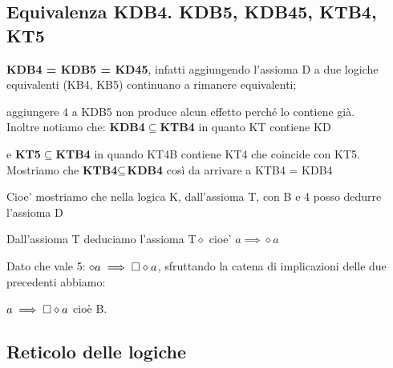 \subsection{Equivalenza KDB4. KDB5, KDB45, KTB4, KT5}

\textbf{KDB4 = KDB5 = KD45}, infatti aggiungendo l'assioma D a due
logiche equivalenti (KB4, KB5) continuano a rimanere equivalenti;

aggiungere 4 a KDB5 non produce alcun effetto perché lo contiene già.\\


Inoltre notiamo che: \textbf{KDB4$\subseteq$KTB4} in quanto KT contiene
KD

e \textbf{KT5$\subseteq$KTB4} in quando KT4B contiene KT4 che coincide
con KT5.\\


Mostriamo che \textbf{KTB4$\mbox{\ensuremath{\subseteq}}$KDB4 }così
da arrivare a KTB4 = KDB4

Cioe' mostriamo che nella logica K, dall'assioma T, con B e 4 posso
dedurre l'assioma D

Dall'assioma T deduciamo l'assioma T$\diamond$ cioe' $a\implies\diamond a$

Dato che vale 5: $\diamond a\implies\square\diamond a$, sfruttando la catena
di implicazioni delle due precedenti abbiamo:

$a\implies\square\diamond a$ cioè B.\\



\subsection{Reticolo delle logiche}


